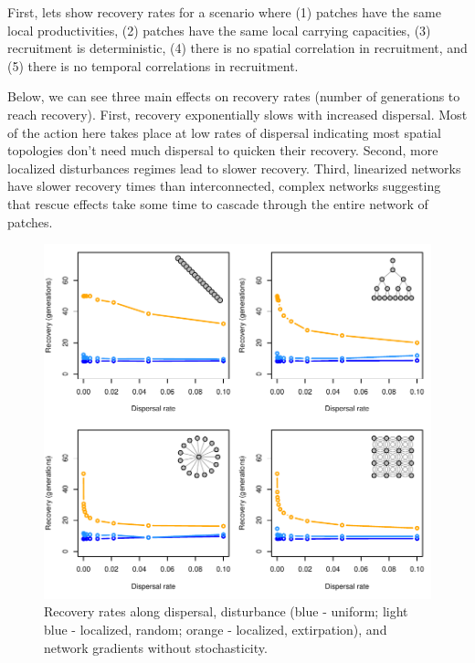 \documentclass[]{article}
\begin{document}
First, lets show recovery rates for a scenario where (1) patches have
the same local productivities, (2) patches have the same local carrying
capacities, (3) recruitment is deterministic, (4) there is no spatial
correlation in recruitment, and (5) there is no temporal correlations in
recruitment.

Below, we can see three main effects on recovery rates (number of
generations to reach recovery). First, recovery exponentially slows with
increased dispersal. Most of the action here takes place at low rates of
dispersal indicating most spatial topologies don't need much dispersal
to quicken their recovery. Second, more localized disturbances regimes
lead to slower recovery. Third, linearized networks have slower recovery
times than interconnected, complex networks suggesting that rescue
effects take some time to cascade through the entire network of patches.

\begin{figure}[H]

{\centering \includegraphics{Managing_for_ecological_surprises_in_metapopulations_makeHTML_files/figure-latex/general results-1} 

}

\caption{Recovery rates along dispersal, disturbance (blue - uniform; light blue - localized, random; orange - localized, extirpation), and network gradients without stochasticity.}\label{fig:general results}
\end{figure}
\end{document}
